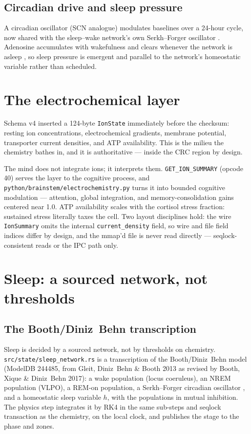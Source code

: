 \documentclass[11pt]{article}
\newcommand{\code}[1]{\texttt{\small #1}}
\begin{document}
\subsection{Circadian drive and sleep pressure}

A circadian oscillator (SCN analogue) modulates baselines over a
24-hour cycle, now shared with the sleep--wake network's own Serkh--Forger
oscillator \cite{serkh}. Adenosine accumulates with wakefulness and clears whenever
the network is asleep \cite{borbely,xie}, so sleep pressure is emergent and parallel to
the network's homeostatic variable rather than scheduled.

\section{The electrochemical layer}

Schema v4 inserted a 124-byte \code{IonState} immediately before the
checksum: resting ion concentrations, electrochemical gradients,
membrane potential, transporter current densities, and ATP
availability. This is the milieu the chemistry bathes in, and it is
authoritative --- inside the CRC region by design.

The mind does not integrate ions; it interprets them.
\code{GET\_ION\_SUMMARY} (opcode 40) serves the layer to the cognitive
process, and \code{python/brainstem/electrochemistry.py} turns it into
bounded cognitive modulation --- attention, global integration, and
memory-consolidation gains centered near 1.0. ATP availability scales
with the cortisol stress fraction: sustained stress literally taxes the
cell. Two layout disciplines hold: the wire \code{IonSummary} omits the
internal \code{current\_density} field, so wire and file field indices
differ by design, and the mmap'd file is never read directly ---
seqlock-consistent reads or the IPC path only.

\section{Sleep: a sourced network, not thresholds}

\subsection{The Booth/Diniz~Behn transcription}

Sleep is decided by a sourced network, not by thresholds on chemistry.
\code{src/state/sleep\_network.rs} is a transcription of the
Booth/Diniz~Behn model \cite{booth2013,booth2017} (ModelDB 244485, from Gleit, Diniz~Behn \&
Booth 2013 as revised by Booth, Xique \& Diniz~Behn 2017): a wake
population (locus coeruleus), an NREM population (VLPO), a REM-on
population, a Serkh--Forger circadian oscillator \cite{serkh}, and a homeostatic
sleep variable $h$, with the populations in mutual inhibition. The
physics step integrates it by RK4 in the same sub-steps and seqlock
transaction as the chemistry, on the local clock, and publishes the
stage to the phase and zones.
\end{document}
